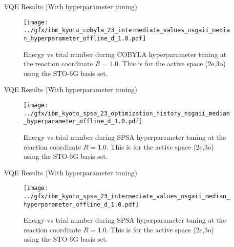 \begin{frame}{VQE Results (With hyperparameter tuning)}
  \begin{figure}
      \centering
      \texttt{[image: ../gfx/ibm\_kyoto\_cobyla\_23\_intermediate\_values\_nsgaii\_median\_hyperparameter\_offline\_d\_1.0.pdf]}
      \caption{Energy vs trial number during COBYLA hyperparameter tuning at the reaction coordinate $R = 1.0$. This is for the active space (2e,3o) using the STO-6G basis set.}
  \end{figure}
\end{frame}

\begin{frame}{VQE Results (With hyperparameter tuning)}
  \begin{figure}
      \centering
      \texttt{[image: ../gfx/ibm\_kyoto\_spsa\_23\_optimization\_history\_nsgaii\_median\_hyperparameter\_offline\_d\_1.0.pdf]}
      \caption{Energy vs trial number during SPSA hyperparameter tuning at the reaction coordinate $R = 1.0$. This is for the active space (2e,3o) using the STO-6G basis set.}
  \end{figure}
\end{frame}


\begin{frame}{VQE Results (With hyperparameter tuning)}
  \begin{figure}
      \centering
      \texttt{[image: ../gfx/ibm\_kyoto\_spsa\_23\_intermediate\_values\_nsgaii\_median\_hyperparameter\_offline\_d\_1.0.pdf]}
      \caption{Energy vs trial number during SPSA hyperparameter tuning at the reaction coordinate $R = 1.0$. This is for the active space (2e,3o) using the STO-6G basis set.}
  \end{figure}
\end{frame}
